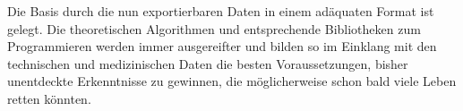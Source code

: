 Die Basis durch die nun exportierbaren Daten in einem adäquaten Format ist gelegt.
Die theoretischen Algorithmen und entsprechende Bibliotheken zum Programmieren werden immer ausgereifter und bilden so im Einklang mit den technischen und medizinischen Daten die besten Voraussetzungen, bisher unentdeckte Erkenntnisse zu gewinnen, die möglicherweise schon bald viele Leben retten könnten.


